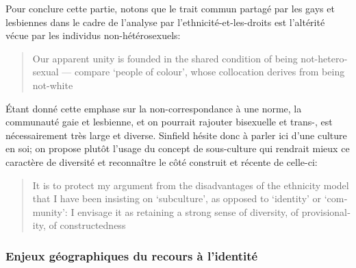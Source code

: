 Pour conclure cette partie, notons que le trait commun partagé par les gays et lesbiennes dans le cadre de l'analyse par l'ethnicité-et-les-droits est l'altérité vécue par les individus non-hétérosexuels: \foreignblockquote{english}[{\cite[289]{Sinfield1996}}][.]{Our apparent unity is founded in the shared condition of being not-heterosexual --- compare `people of colour', whose collocation derives from being not-white}. 
Étant donné cette emphase sur la non-correspondance à une norme, la communauté gaie et lesbienne, et on pourrait rajouter bisexuelle et trans-, est nécessairement très large et diverse. 
Sinfield hésite donc à parler ici d'une culture en soi; on propose plutôt l'usage du concept de sous-culture qui rendrait mieux ce caractère de diversité et reconnaître le côté construit et récente de celle-ci:
\foreignblockquote{english}[{\cite[289]{Sinfield1996}}][.]{It is to protect my argument from the disadvantages of the ethnicity model that I have been insisting on `subculture', as opposed to `identity' or `community': I envisage it as retaining a strong sense of diversity, of provisionality, of constructedness}.



\subsubsection{Enjeux géographiques du recours à l'identité}
\label{sec:enjeux_g_ographiques_du_recours_l_identit_} 

